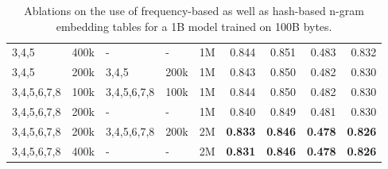 \begin{table}[H]
{\begin{tabular}{@{}lllllrrrr@{}}
           3,4,5 &                 400k &           - &               - &          1M &      0.844 & 0.851 &   0.483 &       0.832 \\
           3,4,5 &                 200k &       3,4,5 &            200k &          1M &      0.843 & 0.850 &   0.482 &       0.830 \\
     3,4,5,6,7,8 &                 100k & 3,4,5,6,7,8 &            100k &          1M &      0.844 & 0.850 &   0.482 &       0.830 \\
     3,4,5,6,7,8 &                 200k &           - &               - &          1M &      0.840 & 0.849 &   0.481 &       0.830 \\
     3,4,5,6,7,8 &                 200k & 3,4,5,6,7,8 &            200k &          2M &      \textbf{0.833} & \textbf{0.846} &   \textbf{0.478} &       \textbf{0.826} \\
     3,4,5,6,7,8 &                 400k &           - &               - &          2M &      \textbf{0.831} & \textbf{0.846} &   \textbf{0.478} &       \textbf{0.826} \\

\bottomrule
\end{tabular}
}
\caption{Ablations on the use of frequency-based as well as hash-based n-gram embedding tables for a 1B \model{} model trained on 100B bytes. }
\label{tab:ngram_ablations_1b_all}
\end{table}